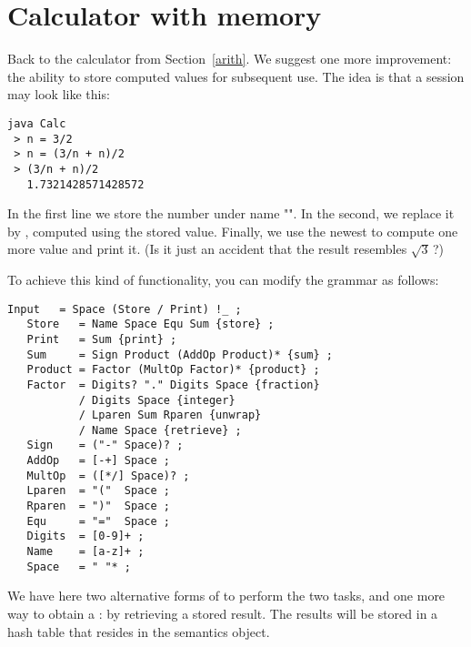 \newpage

\section{Calculator with memory\label{calc}}


Back to the calculator from Section~\ref{arith}.
We suggest one more improvement:
the ability to store computed values for subsequent use.
The idea is that  
a session may look like this:

\small
\begin{Verbatim}[samepage=true,xleftmargin=15mm,baselinestretch=0.8]
 java Calc
 > n = 3/2
 > n = (3/n + n)/2
 > (3/n + n)/2
   1.7321428571428572
\end{Verbatim}
\normalsize

In the first line we store the number  under name "".
In the second, we replace it by , computed using the stored value.
Finally, we use the newest  to compute one more value and print it.
(Is it just an accident that the result resembles $\sqrt{3}$\,?)

To achieve this kind of functionality, you can modify the grammar as follows:

\small
\begin{Verbatim}[frame=single,framesep=2mm,samepage=true,xleftmargin=15mm,xrightmargin=15mm,baselinestretch=0.8]
   Input   = Space (Store / Print) !_ ;
   Store   = Name Space Equ Sum {store} ;
   Print   = Sum {print} ;
   Sum     = Sign Product (AddOp Product)* {sum} ;
   Product = Factor (MultOp Factor)* {product} ;
   Factor  = Digits? "." Digits Space {fraction}
           / Digits Space {integer}
           / Lparen Sum Rparen {unwrap} 
           / Name Space {retrieve} ; 
   Sign    = ("-" Space)? ;
   AddOp   = [-+] Space ;
   MultOp  = ([*/] Space)? ;
   Lparen  = "("  Space ;
   Rparen  = ")"  Space ;
   Equ     = "="  Space ;
   Digits  = [0-9]+ ;
   Name    = [a-z]+ ;
   Space   = " "* ;
\end{Verbatim}
\normalsize

We have here two alternative forms of 
to perform the two tasks,
and one more way to obtain a : 
by retrieving a stored result.
The results will be stored in a hash table 
that resides in the semantics object.

